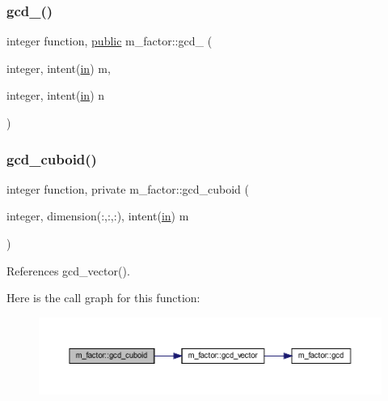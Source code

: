\subsubsection{\texorpdfstring{gcd\+\_()}{gcd\_2()}}
{\footnotesize\ttfamily integer function, \hyperlink{M__stopwatch_83_8txt_a2f74811300c361e53b430611a7d1769f}{public} m\+\_\+factor\+::gcd\+\_ (\begin{DoxyParamCaption}\item[{integer, intent(\hyperlink{M__journal_83_8txt_afce72651d1eed785a2132bee863b2f38}{in})}]{m,  }\item[{integer, intent(\hyperlink{M__journal_83_8txt_afce72651d1eed785a2132bee863b2f38}{in})}]{n }\end{DoxyParamCaption})}

\mbox{\label{namespacem__factor_aff0e6f81edd8efc0fe41822916fb4efa}} 
\subsubsection{\texorpdfstring{gcd\+\_\+cuboid()}{gcd\_cuboid()}}
{\footnotesize\ttfamily integer function, private m\+\_\+factor\+::gcd\+\_\+cuboid (\begin{DoxyParamCaption}\item[{integer, dimension(\+:,\+:,\+:), intent(\hyperlink{M__journal_83_8txt_afce72651d1eed785a2132bee863b2f38}{in})}]{m }\end{DoxyParamCaption})\hspace{0.3cm}{\ttfamily [private]}}



References gcd\+\_\+vector().

Here is the call graph for this function\+:
\nopagebreak
\begin{figure}[H]
\begin{center}
\leavevmode
\includegraphics[width=350pt]{namespacem__factor_aff0e6f81edd8efc0fe41822916fb4efa_cgraph}
\end{center}
\end{figure}
\mbox{\label{namespacem__factor_a6edfef428cb51a2cbe97cfb0ad25da8b}} 
